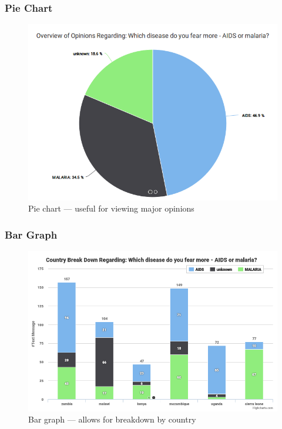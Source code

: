 \documentclass{beamer}
\begin{document}
\begin{frame}
\frametitle{Pie Chart}
  \begin{figure}
    \centering
    \includegraphics[scale=0.3]{./pie.png}
    \caption{Pie chart --- useful for viewing major opinions}
  \end{figure}
\end{frame}

\begin{frame}
\frametitle{Bar Graph}
  \begin{figure}
    \centering
    \includegraphics[scale=0.3]{./bar.png}
    \caption{Bar graph --- allows for breakdown by country}
  \end{figure}
\end{frame}
\end{document}
